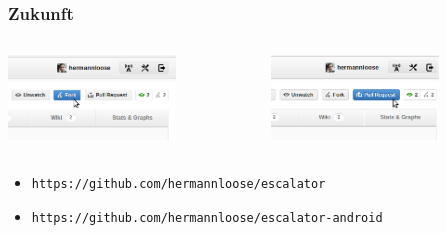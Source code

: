 \documentclass[slidestop,compress,red]{beamer}
\begin{document}
\begin{frame}[c,plain]
  \frametitle{Zukunft}
  \begin{columns}
    \begin{column}{0.4\textwidth}
      \includegraphics[width=12em]{fork}
    \end{column}
    \begin{column}{0.4\textwidth}
      \includegraphics[width=12em]{pullrequest}
    \end{column}
  \end{columns}
  \begin{itemize}
    \item \texttt{https://github.com/hermannloose/escalator}
    \item \texttt{https://github.com/hermannloose/escalator-android}
  \end{itemize}
\end{frame}
\end{document}
